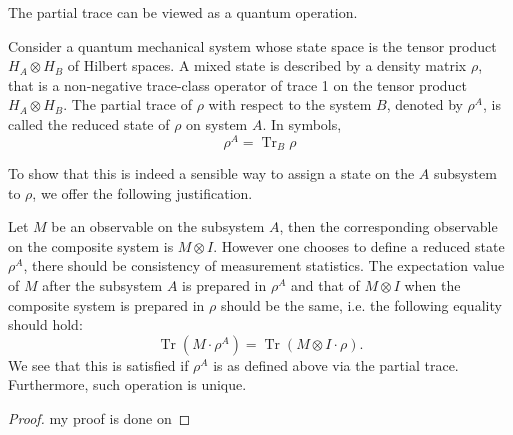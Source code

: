 The partial trace can be viewed as a quantum operation.

Consider a quantum mechanical system whose state space is the tensor product $H_A \otimes H_B$ of Hilbert spaces. A mixed state is described by a density matrix $\rho$, that is a non-negative trace-class operator of trace 1 on the tensor product $H_A \otimes H_B$. The partial trace of $\rho$ with respect to the system $B$, denoted by $\rho^A$, is called the reduced state of $\rho$ on system $A$. In symbols,
$$
\rho^A=\operatorname{Tr}_B \rho
$$

To show that this is indeed a sensible way to assign a state on the $A$ subsystem to $\rho$, we offer the following justification. 

Let $M$ be an observable on the subsystem $A$, then the corresponding observable on the composite system is $M \otimes I$. However one chooses to define a reduced state $\rho^A$, there should be consistency of measurement statistics. The expectation value of $M$ after the subsystem $A$ is prepared in $\rho^A$ and that of $M \otimes I$ when the composite system is prepared in $\rho$ should be the same, i.e. the following equality should hold:
$$
\operatorname{Tr}\left(M \cdot \rho^A\right)=\operatorname{Tr}(M \otimes I \cdot \rho) .
$$
We see that this is satisfied if $\rho^A$ is as defined above via the partial trace. Furthermore, such operation is unique.

\begin{proof}
    my proof is done on
\end{proof}